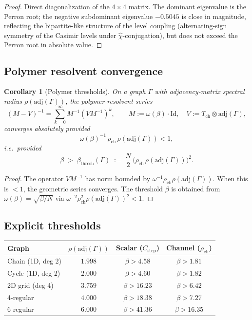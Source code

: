 \documentclass[11pt,a4paper]{article}
\newtheorem{corollary}[theorem]{Corollary}
\theoremstyle{definition}
\begin{document}
\begin{proof}
Direct diagonalization of the $4\times 4$ matrix. The dominant
eigenvalue is the Perron root; the negative subdominant eigenvalue
$-0.5045$ is close in magnitude, reflecting the bipartite-like
structure of the level coupling (alternating-sign symmetry of the
Casimir levels under $\hat\chi$-conjugation), but does not exceed
the Perron root in absolute value.
\end{proof}

\subsection{Polymer resolvent convergence}

\begin{corollary}[Polymer thresholds]\label{cor:polymer}
On a graph $\Gamma$ with adjacency-matrix spectral radius
$\rho(\mathrm{adj}(\Gamma))$, the polymer-resolvent series
\[
(M-V)^{-1} = \sum_{k=0}^\infty M^{-1}(VM^{-1})^k,
\qquad
M := \omega(\beta)\cdot\mathrm{Id},
\quad
V := T_{\mathrm{ch}}\otimes\mathrm{adj}(\Gamma),
\]
converges absolutely provided
\[
\omega(\beta)^{-1}\,\rho_{\mathrm{ch}}\,\rho(\mathrm{adj}(\Gamma)) < 1,
\]
i.e.\ provided
\[
\boxed{\;
\beta \;>\; \beta_{\mathrm{thresh}}(\Gamma)
\;:=\;
\frac{N}{2}\,\big(\rho_{\mathrm{ch}}\,\rho(\mathrm{adj}(\Gamma))\big)^2.
\;}
\]
\end{corollary}

\begin{proof}
The operator $VM^{-1}$ has norm bounded by
$\omega^{-1}\rho_{\mathrm{ch}}\rho(\mathrm{adj}(\Gamma))$. When this
is $<1$, the geometric series converges. The threshold $\beta$ is
obtained from $\omega(\beta) = \sqrt{\beta/N}$ via
$\omega^{-2}\rho_{\mathrm{ch}}^2\rho(\mathrm{adj}(\Gamma))^2 < 1$.
\end{proof}

\subsection{Explicit thresholds}

\begin{center}
\begin{tabular}{l c c c}
\toprule
Graph & $\rho(\mathrm{adj}(\Gamma))$ & Scalar
($C_{\mathrm{step}}$) & Channel ($\rho_{\mathrm{ch}}$) \\
\midrule
Chain (1D, deg 2) & $1.998$ & $\beta > 4.58$ & $\beta > 1.81$ \\
Cycle (1D, deg 2) & $2.000$ & $\beta > 4.60$ & $\beta > 1.82$ \\
2D grid (deg 4) & $3.759$ & $\beta > 16.23$ & $\beta > 6.42$ \\
4-regular & $4.000$ & $\beta > 18.38$ & $\beta > 7.27$ \\
6-regular & $6.000$ & $\beta > 41.36$ & $\beta > 16.35$ \\
\bottomrule
\end{tabular}
\end{center}
\end{document}
